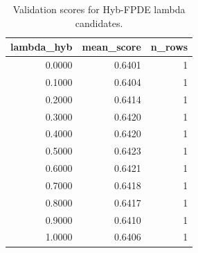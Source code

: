 \begin{table}[t]
\caption{Validation scores for Hyb-FPDE lambda candidates.}
\label{tab:lambda_distribution_computed}
\centering
\begin{tabular}{rrr}
\toprule
lambda\_hyb & mean\_score & n\_rows \\
\midrule
0.0000 & 0.6401 & 1 \\
0.1000 & 0.6404 & 1 \\
0.2000 & 0.6414 & 1 \\
0.3000 & 0.6420 & 1 \\
0.4000 & 0.6420 & 1 \\
0.5000 & 0.6423 & 1 \\
0.6000 & 0.6421 & 1 \\
0.7000 & 0.6418 & 1 \\
0.8000 & 0.6417 & 1 \\
0.9000 & 0.6410 & 1 \\
1.0000 & 0.6406 & 1 \\
\bottomrule
\end{tabular}

\end{table}
